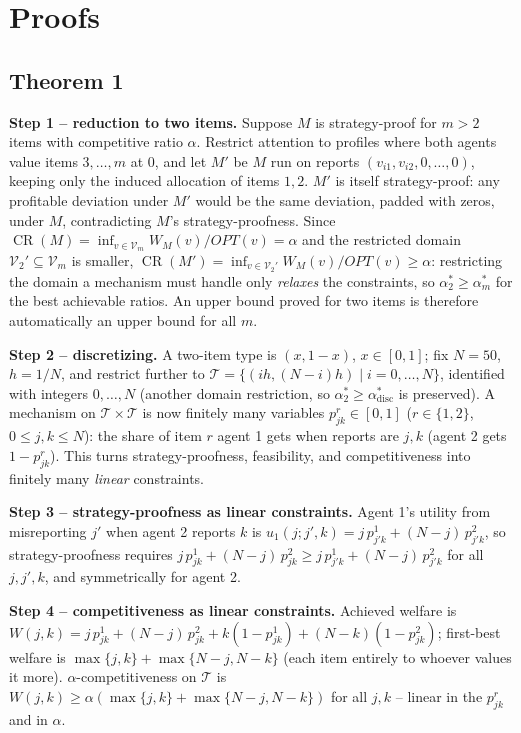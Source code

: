 \section{Proofs}
\subsection{Theorem 1}
\textbf{Step 1 -- reduction to two items.}
Suppose $M$ is strategy-proof for $m>2$ items with competitive ratio
$\alpha$. Restrict attention to profiles where both agents value items
$3,\ldots,m$ at $0$, and let $M'$ be $M$ run on reports
$(v_{i1},v_{i2},0,\ldots,0)$, keeping only the induced allocation of items
$1,2$. $M'$ is itself strategy-proof: any profitable deviation under $M'$
would be the same deviation, padded with zeros, under $M$, contradicting
$M$'s strategy-proofness. Since $\operatorname{CR}(M)=\inf_{v\in\mathcal V_m} W_M(v)/OPT(v)=\alpha$
and the restricted domain $\mathcal V_2'\subseteq\mathcal V_m$ is smaller,
$\operatorname{CR}(M')=\inf_{v\in\mathcal V_2'}W_M(v)/OPT(v)\ge\alpha$: restricting
the domain a mechanism must handle only \emph{relaxes} the constraints, so
$\alpha_2^*\ge\alpha_m^*$ for the best achievable ratios. An upper bound
proved for two items is therefore automatically an upper bound for all $m$.

\textbf{Step 2 -- discretizing.}
A two-item type is $(x,1-x)$, $x\in[0,1]$; fix $N=50$, $h=1/N$, and restrict
further to $\mathcal T=\{(ih,(N-i)h)\mid i=0,\dots,N\}$, identified with
integers $0,\dots,N$ (another domain restriction, so $\alpha_2^*\ge\alpha_{\mathrm{disc}}^*$
is preserved). A mechanism on $\mathcal T\times\mathcal T$ is now finitely
many variables $p^r_{jk}\in[0,1]$ ($r\in\{1,2\}$, $0\le j,k\le N$): the share
of item $r$ agent 1 gets when reports are $j,k$ (agent 2 gets $1-p^r_{jk}$).
This turns strategy-proofness, feasibility, and competitiveness into finitely
many \emph{linear} constraints.

\textbf{Step 3 -- strategy-proofness as linear constraints.}
Agent 1's utility from misreporting $j'$ when agent 2 reports $k$ is
$u_1(j;j',k)=j\,p^1_{j'k}+(N-j)\,p^2_{j'k}$, so strategy-proofness requires
$j\,p^1_{jk}+(N-j)\,p^2_{jk}\ge j\,p^1_{j'k}+(N-j)\,p^2_{j'k}$ for all
$j,j',k$, and symmetrically for agent 2.

\textbf{Step 4 -- competitiveness as linear constraints.}
Achieved welfare is $W(j,k)=j\,p^1_{jk}+(N-j)\,p^2_{jk}+k(1-p^1_{jk})+(N-k)(1-p^2_{jk})$;
first-best welfare is $\max\{j,k\}+\max\{N-j,N-k\}$ (each item entirely to
whoever values it more). $\alpha$-competitiveness on $\mathcal T$ is
$W(j,k)\ge\alpha(\max\{j,k\}+\max\{N-j,N-k\})$ for all $j,k$ -- linear in the
$p^r_{jk}$ and in $\alpha$.


